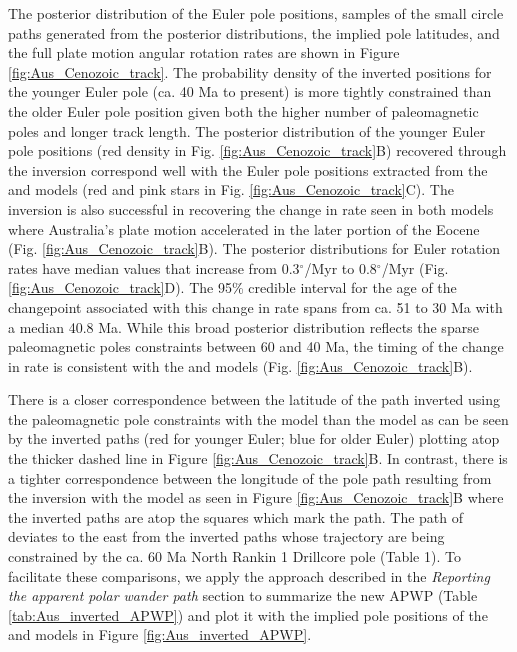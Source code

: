 \documentclass[]{agujournal2019}
\begin{document}
The posterior distribution of the Euler pole positions, samples of the small circle paths generated from the posterior distributions, the implied pole latitudes, and the full plate motion angular rotation rates are shown in Figure \ref{fig:Aus_Cenozoic_track}. The probability density of the inverted positions for the younger Euler pole (ca. 40 Ma to present) is more tightly constrained than the older Euler pole position given both the higher number of paleomagnetic poles and longer track length. The posterior distribution of the younger Euler pole positions (red density in Fig. \ref{fig:Aus_Cenozoic_track}B) recovered through the inversion correspond well with the Euler pole positions extracted from the  and  models (red and pink stars in Fig. \ref{fig:Aus_Cenozoic_track}C). The inversion is also successful in recovering the change in rate seen in both models where Australia's plate motion accelerated in the later portion of the Eocene (Fig. \ref{fig:Aus_Cenozoic_track}B). The posterior distributions for Euler rotation rates have median values that increase from 0.3$^\circ$/Myr to 0.8$^\circ$/Myr (Fig. \ref{fig:Aus_Cenozoic_track}D). The 95\% credible interval for the age of the changepoint associated with this change in rate spans from ca. 51 to 30 Ma with a median 40.8 Ma. While this broad posterior distribution reflects the sparse paleomagnetic poles constraints between 60 and 40 Ma, the timing of the change in rate is consistent with the  and  models (Fig. \ref{fig:Aus_Cenozoic_track}B). 

There is a closer correspondence between the latitude of the path inverted using the paleomagnetic pole constraints with the  model than the  model as can be seen by the inverted paths (red for younger Euler; blue for older Euler) plotting atop the thicker dashed line in Figure \ref{fig:Aus_Cenozoic_track}B. In contrast, there is a tighter correspondence between the longitude of the pole path resulting from the inversion with the  model as seen in Figure \ref{fig:Aus_Cenozoic_track}B where the inverted paths are atop the squares which mark the  path. The path of  deviates to the east from the inverted paths whose trajectory are being constrained by the ca. 60 Ma North Rankin 1 Drillcore pole (Table 1). To facilitate these comparisons, we apply the approach described in the \textit{Reporting the apparent polar wander path} section to summarize the new APWP (Table \ref{tab:Aus_inverted_APWP}) and plot it with the implied pole positions of the  and  models in Figure \ref{fig:Aus_inverted_APWP}.
\end{document}

